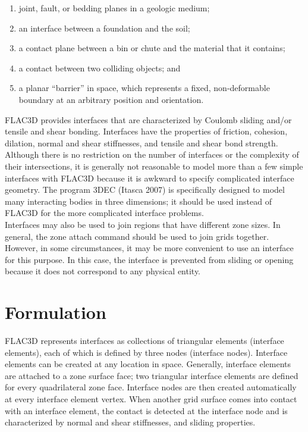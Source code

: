 \documentclass[a4paper, nobind]{templates/ociamthesis}
\providecommand{\tightlist}{%
  \setlength{\itemsep}{0pt}\setlength{\parskip}{0pt}}
\begin{document}
\begin{enumerate}
\def\labelenumi{\arabic{enumi}.}
\tightlist
\item
  joint, fault, or bedding planes in a geologic medium;
\item
  an interface between a foundation and the soil;
\item
  a contact plane between a bin or chute and the material that it
  contains;
\item
  a contact between two colliding objects; and
\item
  a planar ``barrier'' in space, which represents a fixed,
  non-deformable boundary at an arbitrary position and orientation.\\
\end{enumerate}

FLAC3D provides interfaces that are characterized by Coulomb sliding
and/or tensile and shear bonding. Interfaces have the properties of
friction, cohesion, dilation, normal and shear stiffnesses, and tensile
and shear bond strength. Although there is no restriction on the number
of interfaces or the complexity of their intersections, it is generally
not reasonable to model more than a few simple interfaces with FLAC3D
because it is awkward to specify complicated interface geometry. The
program 3DEC (Itasca 2007) is specifically designed to model many
interacting bodies in three dimensions; it should be used instead of
FLAC3D for the more complicated interface problems.\\

Interfaces may also be used to join regions that have different zone
sizes. In general, the zone attach command should be used to join grids
together. However, in some circumstances, it may be more convenient to
use an interface for this purpose. In this case, the interface is
prevented from sliding or opening because it does not correspond to any
physical entity.

\hypertarget{formulation}{%
\section{Formulation}\label{formulation}}

FLAC3D represents interfaces as collections of triangular elements
(interface elements), each of which is defined by three nodes (interface
nodes). Interface elements can be created at any location in space.
Generally, interface elements are attached to a zone surface face; two
triangular interface elements are defined for every quadrilateral zone
face. Interface nodes are then created automatically at every interface
element vertex. When another grid surface comes into contact with an
interface element, the contact is detected at the interface node and is
characterized by normal and shear stiffnesses, and sliding properties.\\
\end{document}
